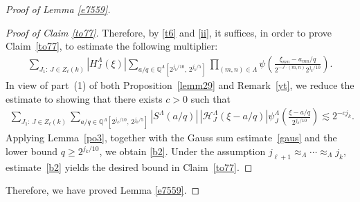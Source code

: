 \documentclass[10pt,a4paper]{amsart}
\numberwithin{equation}{section}
\begin{document}
\begin{proof}[Proof of Lemma \ref{e7559}]
\begin{proof}[Proof of Claim \ref{to77}]
Therefore, by \eqref{t6} and \eqref{ii}, it suffices, in order to prove Claim~\ref{to77}, to estimate the following multiplier:
\begin{align*} 
	\sum_{J_1:\,J\in Z_\ell(k)} |H^{\Lambda}_J(\xi)| \sum_{a/q \in \mathbb{Q}^{\Lambda}[2^{j_k/10},\,2^{j_k/5}]} \prod_{(m,n)\in\Lambda} \psi\!\left( \frac{\xi_{mn}-a_{mn}/q}{2^{-J\cdot (m,n)}2^{j_k/10}} \right). 
\end{align*}
 In view of part~(1) of both Proposition~\ref{lemm29} and Remark~\ref{yt}, we  reduce the estimate to showing that there exists $c>0$ such that
\begin{align}\label{b2}
\sum_{J_1:\,J\in Z_\ell(k)}
\sum_{a/q \in \mathbb{Q}^{\Lambda}[2^{j_k/10},\,2^{j_k/5}]}
|S^{\Lambda}(a/q)|\,
|\mathcal{H}^{\Lambda}_J(\xi-a/q)|
\psi_J^{\Lambda}\!\left(
\frac{\xi-a/q}{2^{j_k/10}}
\right)
\lesssim 2^{-c j_k}.
\end{align}
Applying Lemma~\ref{po3}, together with the Gauss sum estimate~\eqref{gaus} and the lower bound $q\ge 2^{j_k/10}$, we  obtain \eqref{b2}. Under the assumption
$j_{\ell+1}\approx_{\Lambda}\cdots\approx_{\Lambda} j_k,$
estimate~\eqref{b2} yields the desired bound in Claim~\ref{to77}.

\end{proof}
 Therefore, we have proved Lemma \ref{e7559}.
\end{proof}

 
 
\end{document}
